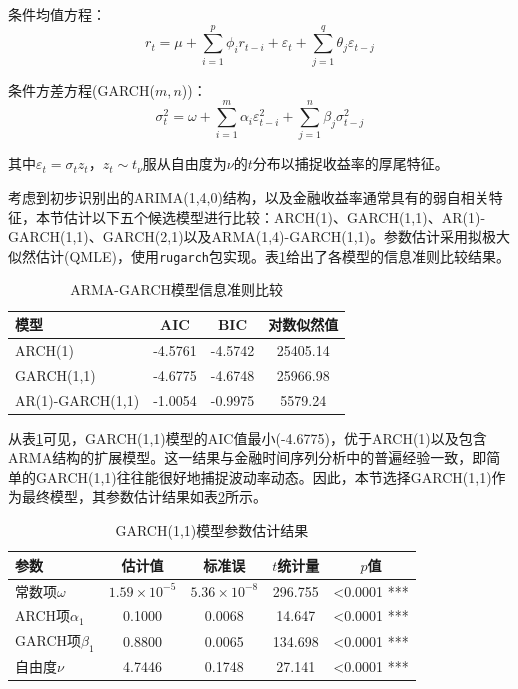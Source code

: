 \documentclass[10pt, a4paper]{ctexart}
\theoremstyle{definition}
\numberwithin{equation}{section}
\numberwithin{figure}{section}
\numberwithin{table}{section}
\begin{document}
条件均值方程：
\begin{equation}
r_t = \mu + \sum_{i=1}^{p}\phi_i r_{t-i} + \varepsilon_t + \sum_{j=1}^{q}\theta_j \varepsilon_{t-j}
\end{equation}

条件方差方程(GARCH(\(m,n\)))：
\begin{equation}
\sigma_t^2 = \omega + \sum_{i=1}^{m}\alpha_i \varepsilon_{t-i}^2 + \sum_{j=1}^{n}\beta_j \sigma_{t-j}^2
\end{equation}

其中\(\varepsilon_t = \sigma_t z_t\)，\(z_t \sim t_{\nu}\)服从自由度为\(\nu\)的\(t\)分布以捕捉收益率的厚尾特征。

考虑到初步识别出的ARIMA(1,4,0)结构，以及金融收益率通常具有的弱自相关特征，本节估计以下五个候选模型进行比较：ARCH(1)、GARCH(1,1)、AR(1)-GARCH(1,1)、GARCH(2,1)以及ARMA(1,4)-GARCH(1,1)。参数估计采用拟极大似然估计(QMLE)，使用\texttt{rugarch}包实现。表\ref{tab:model_compare}给出了各模型的信息准则比较结果。

\begin{table}[H]
\centering
\caption{ARMA-GARCH模型信息准则比较}
\label{tab:model_compare}
\begin{tabular}{lccc}
\toprule
模型 & AIC & BIC & 对数似然值 \\
\midrule
ARCH(1)           & -4.5761 & -4.5742 & 25405.14 \\
GARCH(1,1)        & -4.6775 & -4.6748 & 25966.98 \\
AR(1)-GARCH(1,1)  & -1.0054 & -0.9975 & 5579.24 \\
\bottomrule
\end{tabular}
\end{table}

从表\ref{tab:model_compare}可见，GARCH(1,1)模型的AIC值最小(-4.6775)，优于ARCH(1)以及包含ARMA结构的扩展模型。这一结果与金融时间序列分析中的普遍经验一致，即简单的GARCH(1,1)往往能很好地捕捉波动率动态。因此，本节选择GARCH(1,1)作为最终模型，其参数估计结果如表\ref{tab:garch_coef}所示。

\begin{table}[H]
\centering
\caption{GARCH(1,1)模型参数估计结果}
\label{tab:garch_coef}
\begin{tabular}{lcccc}
\toprule
参数 & 估计值 & 标准误 & \(t\)统计量 & \(p\)值 \\
\midrule
常数项\(\omega\) & \(1.59 \times 10^{-5}\) & \(5.36 \times 10^{-8}\) & 296.755 & \textless{}0.0001 *** \\
ARCH项\(\alpha_1\) & 0.1000 & 0.0068 & 14.647 & \textless{}0.0001 *** \\
GARCH项\(\beta_1\) & 0.8800 & 0.0065 & 134.698 & \textless{}0.0001 *** \\
自由度\(\nu\)   & 4.7446  & 0.1748  & 27.141 & \textless{}0.0001 *** \\
\bottomrule
\end{tabular}
\end{table}
\end{document}
